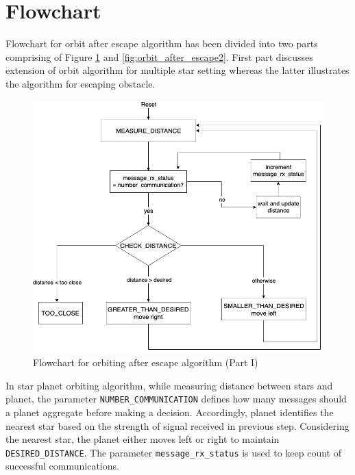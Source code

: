 \documentclass{report}[12pt]
\begin{document}
\section{Flowchart}
Flowchart for orbit after escape algorithm has been divided into two parts comprising of Figure \ref{fig:orbit_after_escape1} and \ref{fig:orbit_after_escape2}. First part discusses extension of orbit algorithm for multiple star setting whereas the latter illustrates the algorithm for escaping obstacle.
\begin{figure}[H]
	\centering
	\includegraphics[scale=0.55]{star_planet_escape1}
	\caption{Flowchart for orbiting after escape algorithm (Part I)}
	\label{fig:orbit_after_escape1}
\end{figure}

In star planet orbiting algorithm, while measuring distance between stars and planet, the parameter \texttt{NUMBER\_COMMUNICATION} defines how many messages should a planet aggregate before making a decision. Accordingly, planet identifies the nearest star based on the strength of signal received in previous step. Considering the nearest star, the planet either moves left or right to maintain \texttt{DESIRED\_DISTANCE}. The parameter \texttt{message\_rx\_status} is used to keep count of successful communications.
\end{document}
